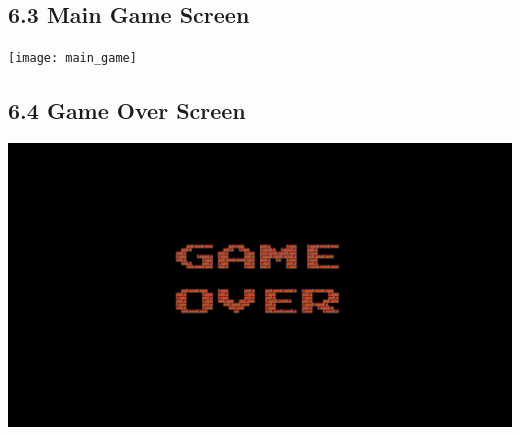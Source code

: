 \documentclass[12pt]{report}
\begin{document}
\subsection*{6.3 Main Game Screen}
\texttt{[image: main\_game]}

\subsection*{6.4 Game Over Screen}
\includegraphics[width=\textwidth]{screen_gameover}
\end{document}
